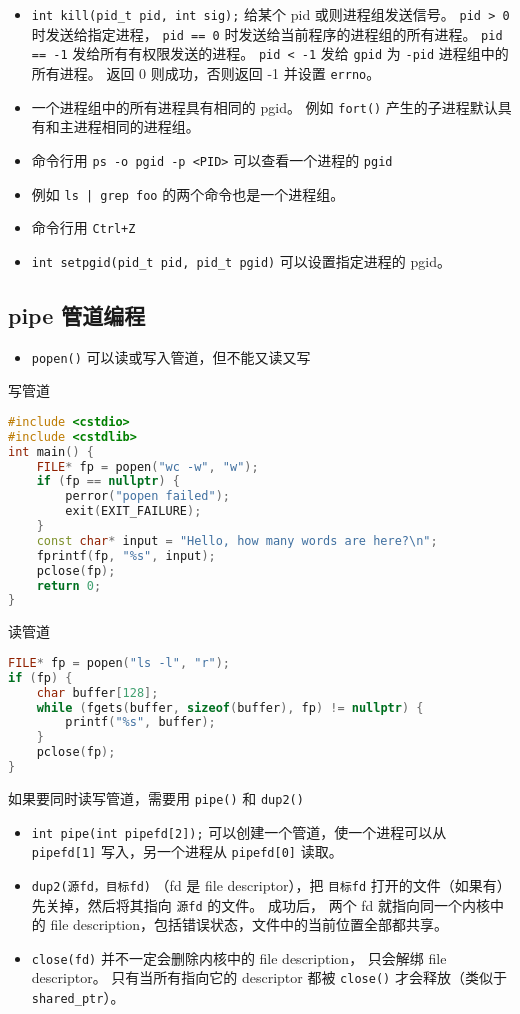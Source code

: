 \begin{itemize}
\item \verb`int kill(pid_t pid, int sig);` 给某个 pid 或则进程组发送信号。 \verb`pid > 0` 时发送给指定进程， \verb`pid == 0` 时发送给当前程序的进程组的所有进程。 \verb`pid == -1` 发给所有有权限发送的进程。 \verb`pid < -1` 发给 \verb`gpid` 为 \verb`-pid` 进程组中的所有进程。 返回 0 则成功，否则返回 -1 并设置 \verb`errno`。
\item 一个进程组中的所有进程具有相同的 pgid。 例如 \verb`fort()` 产生的子进程默认具有和主进程相同的进程组。
\item 命令行用 \verb`ps -o pgid -p <PID>` 可以查看一个进程的 \verb`pgid`
\item 例如 \verb`ls | grep foo` 的两个命令也是一个进程组。
\item 命令行用 \verb`Ctrl+Z`
\item \verb`int setpgid(pid_t pid, pid_t pgid)` 可以设置指定进程的 pgid。
\end{itemize}

\subsection{pipe 管道编程}
\begin{itemize}
\item \verb`popen()` 可以读或写入管道，但不能又读又写
\end{itemize}

写管道
\begin{lstlisting}[language=cpp]
#include <cstdio>
#include <cstdlib>
int main() {
    FILE* fp = popen("wc -w", "w");
    if (fp == nullptr) {
        perror("popen failed");
        exit(EXIT_FAILURE);
    }
    const char* input = "Hello, how many words are here?\n";
    fprintf(fp, "%s", input);
    pclose(fp);
    return 0;
}
\end{lstlisting}
读管道
\begin{lstlisting}[language=cpp]
FILE* fp = popen("ls -l", "r");
if (fp) {
    char buffer[128];
    while (fgets(buffer, sizeof(buffer), fp) != nullptr) {
        printf("%s", buffer);
    }
    pclose(fp);
}
\end{lstlisting}

如果要同时读写管道，需要用 \verb`pipe()` 和 \verb`dup2()`
\begin{itemize}
\item \verb`int pipe(int pipefd[2]);` 可以创建一个管道，使一个进程可以从 \verb`pipefd[1]` 写入，另一个进程从 \verb`pipefd[0]` 读取。
\item \verb`dup2(源fd，目标fd)` （fd 是 file descriptor），把 \verb`目标fd` 打开的文件（如果有）先关掉，然后将其指向 \verb`源fd` 的文件。 成功后， 两个 fd 就指向同一个内核中的 file description，包括错误状态，文件中的当前位置全部都共享。
\item \verb`close(fd)` 并不一定会删除内核中的 file description， 只会解绑 file descriptor。 只有当所有指向它的 descriptor 都被 \verb`close()` 才会释放（类似于 \verb`shared_ptr`）。
\end{itemize}

